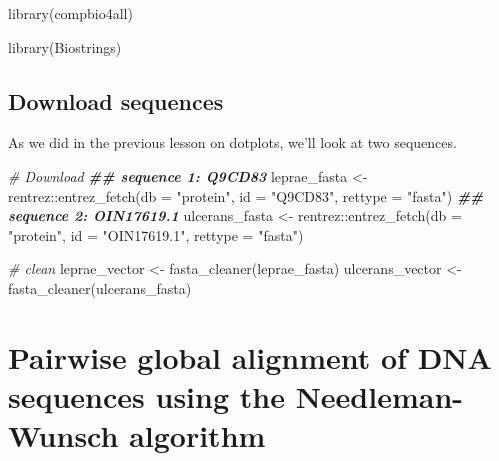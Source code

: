 \documentclass[
]{book}
\newenvironment{Shaded}{\begin{snugshade}}{\end{snugshade}}
\newcommand{\AttributeTok}[1]{\textcolor[rgb]{0.77,0.63,0.00}{#1}}
\newcommand{\CommentTok}[1]{\textcolor[rgb]{0.56,0.35,0.01}{\textit{#1}}}
\newcommand{\DocumentationTok}[1]{\textcolor[rgb]{0.56,0.35,0.01}{\textbf{\textit{#1}}}}
\newcommand{\FunctionTok}[1]{\textcolor[rgb]{0.00,0.00,0.00}{#1}}
\newcommand{\NormalTok}[1]{#1}
\newcommand{\OtherTok}[1]{\textcolor[rgb]{0.56,0.35,0.01}{#1}}
\newcommand{\SpecialCharTok}[1]{\textcolor[rgb]{0.00,0.00,0.00}{#1}}
\newcommand{\StringTok}[1]{\textcolor[rgb]{0.31,0.60,0.02}{#1}}
\begin{document}
\begin{Shaded}
\begin{Highlighting}[]
\FunctionTok{library}\NormalTok{(compbio4all)}

\FunctionTok{library}\NormalTok{(Biostrings)}
\end{Highlighting}
\end{Shaded}

\hypertarget{download-sequences-2}{%
\subsection{Download sequences}\label{download-sequences-2}}

As we did in the previous lesson on dotplots, we'll look at two sequences.

\begin{Shaded}
\begin{Highlighting}[]
\CommentTok{\# Download}
\DocumentationTok{\#\# sequence 1: Q9CD83}
\NormalTok{leprae\_fasta }\OtherTok{\textless{}{-}}\NormalTok{ rentrez}\SpecialCharTok{::}\FunctionTok{entrez\_fetch}\NormalTok{(}\AttributeTok{db =} \StringTok{"protein"}\NormalTok{,}
                        \AttributeTok{id =} \StringTok{"Q9CD83"}\NormalTok{,}
                         \AttributeTok{rettype =} \StringTok{"fasta"}\NormalTok{)}
\DocumentationTok{\#\# sequence 2: OIN17619.1}
\NormalTok{ulcerans\_fasta }\OtherTok{\textless{}{-}}\NormalTok{ rentrez}\SpecialCharTok{::}\FunctionTok{entrez\_fetch}\NormalTok{(}\AttributeTok{db =} \StringTok{"protein"}\NormalTok{,}
                         \AttributeTok{id =} \StringTok{"OIN17619.1"}\NormalTok{,}
                         \AttributeTok{rettype =} \StringTok{"fasta"}\NormalTok{)}

\CommentTok{\# clean}
\NormalTok{leprae\_vector   }\OtherTok{\textless{}{-}} \FunctionTok{fasta\_cleaner}\NormalTok{(leprae\_fasta)}
\NormalTok{ulcerans\_vector }\OtherTok{\textless{}{-}} \FunctionTok{fasta\_cleaner}\NormalTok{(ulcerans\_fasta)}
\end{Highlighting}
\end{Shaded}

\hypertarget{pairwise-global-alignment-of-dna-sequences-using-the-needleman-wunsch-algorithm}{%
\section{Pairwise global alignment of DNA sequences using the Needleman-Wunsch algorithm}\label{pairwise-global-alignment-of-dna-sequences-using-the-needleman-wunsch-algorithm}}
\end{document}
